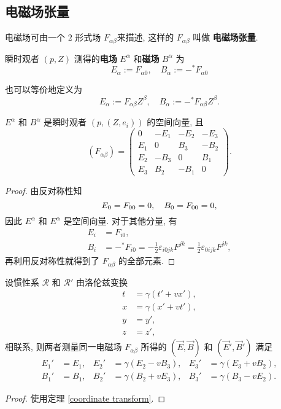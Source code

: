 \subsection{电磁场张量}
电磁场可由一个 $ 2 $ 形式场 $ F_{\alpha\beta} $来描述, 这样的 $F_{\alpha\beta}$ 叫做 {\bf 电磁场张量}.
\begin{definition}
    瞬时观者 $ (p,Z) $ 测得的{\bf 电场} $ E^\alpha $ 和{\bf 磁场} $ B^\alpha $ 为 
    \[ E_\alpha:=F_{\alpha 0},\quad B_\alpha:=-{}^{*}\!F_{\alpha 0} \] 
\end{definition}
\begin{remark}
    也可以等价地定义为
    \[ E_\alpha:=F_{\alpha\beta}Z^\beta,\quad B_\alpha:=-{}^{*}\!F_{\alpha\beta}Z^\beta. \]
\end{remark}
\begin{proposition}
    $ E^\alpha $ 和 $ B^\alpha $ 是瞬时观者 $ (p,(Z,e_i)) $ 的空间向量, 且
    \[ (F_{\alpha\beta})=\left(\begin{matrix}
        0 & -E_1 & -E_2 & -E_3\\ 
        E_1 & 0 & B_3 & -B_2\\ 
        E_2 & -B_3 & 0 & B_1\\ 
        E_3 & B_2 & -B_1 & 0
    \end{matrix}\right). \]
\end{proposition}
\begin{proof}
    由反对称性知
    \[ E_0=F_{00}=0,\\\quad B_0=F_{00}=0,\]
    因此 $ E^\alpha $ 和 $ E^\alpha $ 是空间向量.
    对于其他分量, 有
    \begin{align*}
        E_i &= F_{i0},\\
        B_i &= -{}^{*}\!F_{i0}=-\frac{1}{2}\varepsilon_{i0jk}F^{jk}=\frac{1}{2}\varepsilon_{0ijk}F^{jk},
    \end{align*}
    再利用反对称性就得到了 $F_{\alpha\beta}$ 的全部元素.
\end{proof}
\begin{proposition}
    设惯性系 $ \mathcal{R} $ 和 $ \mathcal{R}' $ 由洛伦兹变换
    \begin{align*}
        t&=\gamma(t'+vx'), \\
        x&=\gamma(x'+vt'), \\ 
        y&=y',\\ 
        z&=z',
    \end{align*}
    相联系, 则两者测量同一电磁场 $ F_{\alpha\beta} $ 所得的 $ (\vec{E},\vec{B}) $ 和 $ (\vec{E}',\vec{B}') $ 满足 
    \begin{align*}
        E_1'&=E_1, & E_2'&=\gamma(E_2-vB_3), & E_3'&=\gamma(E_3+vB_2), \\ 
        B_1'&= B_1, & B_2'&=\gamma(B_2+vE_3), & B_3'&=\gamma(B_3-vE_2).
    \end{align*}
\end{proposition}
\begin{proof}
    使用定理 \ref{coordinate transform}.
\end{proof}

